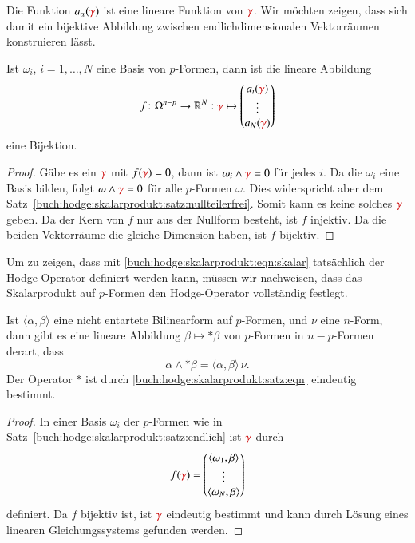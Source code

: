 Die Funktion $a_\alpha({\color{darkred}\gamma})$ ist eine lineare
Funktion von ${\color{darkred}\gamma}$.
Wir möchten zeigen, dass sich damit ein bijektive Abbildung zwischen
endlichdimensionalen Vektorräumen konstruieren lässt.

\begin{satz}
\label{buch:hodge:skalarprodukt:satz:endlich}
Ist $\omega_i$, $i=1,\dots,N$ eine Basis von $p$-Formen, dann ist die
lineare Abbildung
\[
f
\colon
\Omega^{n-p}
\to
\mathbb{R}^N
:
{\color{darkred}\gamma}
\mapsto
\begin{pmatrix}
a_i({\color{darkred}\gamma})\\
\vdots\\
a_N({\color{darkred}\gamma})
\end{pmatrix}
\]
eine Bijektion.
\end{satz}

\begin{proof}
Gäbe es ein ${\color{darkred}\gamma}$ mit $f({\color{darkred}\gamma})=0$,
dann ist $\omega_i\wedge{\color{darkred}\gamma}=0$ für jedes $i$.
Da die $\omega_i$ eine Basis bilden, folgt
$\omega\wedge{\color{darkred}\gamma}=0$ für alle $p$-Formen $\omega$.
Dies widerspricht aber dem
Satz~\ref{buch:hodge:skalarprodukt:satz:nullteilerfrei}.
Somit kann es keine solches ${\color{darkred}\gamma}$ geben.
Da der Kern von $f$ nur aus der Nullform besteht, ist $f$ injektiv.
Da die beiden Vektorräume die gleiche Dimension haben, ist $f$ bijektiv.
\end{proof}

Um zu zeigen, dass mit \eqref{buch:hodge:skalarprodukt:eqn:skalar}
tatsächlich der Hodge-Operator definiert werden kann, müssen wir
nachweisen, dass das Skalarprodukt auf $p$-Formen den Hodge-Operator
vollständig festlegt.

\begin{satz}
\label{buch:hodge:satz:eindeutigkeit}
Ist $\langle\alpha,\beta\rangle$ eine nicht entartete Bilinearform
auf $p$-Formen, und $\nu$ eine $n$-Form, dann gibt es eine lineare
Abbildung $\beta\mapsto \ast\beta$ von $p$-Formen in $n-p$-Formen
derart, dass
\begin{equation}
\alpha\wedge {\ast\beta}
=
\langle\alpha,\beta\rangle\,\nu.
\label{buch:hodge:skalarprodukt:satz:eqn}
\end{equation}
Der Operator $\ast$ ist durch
\eqref{buch:hodge:skalarprodukt:satz:eqn}
eindeutig bestimmt.
\end{satz}

\begin{proof}
In einer Basis $\omega_i$ der $p$-Formen wie in
Satz~\ref{buch:hodge:skalarprodukt:satz:endlich}
ist ${\color{darkred}\gamma}$ durch 
\[
f({\color{darkred}\gamma})
=
\begin{pmatrix}
\langle \omega_1,\beta\rangle\\
\vdots\\
\langle \omega_N,\beta\rangle
\end{pmatrix}
\]
definiert.
Da $f$ bijektiv ist, ist ${\color{darkred}\gamma}$ eindeutig
bestimmt und kann durch Lösung eines linearen Gleichungssystems
gefunden werden.
\end{proof}

